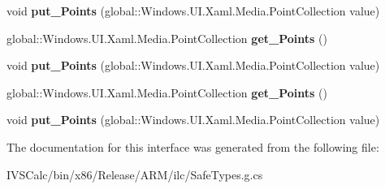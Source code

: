 \begin{DoxyCompactItemize}
\mbox{\label{interface_windows_1_1_u_i_1_1_xaml_1_1_shapes_1_1_i_polygon_aff4656dda579146484457971ae043261}} 
void {\bfseries put\+\_\+\+Points} (global\+::\+Windows.\+U\+I.\+Xaml.\+Media.\+Point\+Collection value)
\item 
\mbox{\label{interface_windows_1_1_u_i_1_1_xaml_1_1_shapes_1_1_i_polygon_a53564a340ab3f6f90c8fa9e62a58c5da}} 
global\+::\+Windows.\+U\+I.\+Xaml.\+Media.\+Point\+Collection {\bfseries get\+\_\+\+Points} ()
\item 
\mbox{\label{interface_windows_1_1_u_i_1_1_xaml_1_1_shapes_1_1_i_polygon_aff4656dda579146484457971ae043261}} 
void {\bfseries put\+\_\+\+Points} (global\+::\+Windows.\+U\+I.\+Xaml.\+Media.\+Point\+Collection value)
\item 
\mbox{\label{interface_windows_1_1_u_i_1_1_xaml_1_1_shapes_1_1_i_polygon_a53564a340ab3f6f90c8fa9e62a58c5da}} 
global\+::\+Windows.\+U\+I.\+Xaml.\+Media.\+Point\+Collection {\bfseries get\+\_\+\+Points} ()
\item 
\mbox{\label{interface_windows_1_1_u_i_1_1_xaml_1_1_shapes_1_1_i_polygon_aff4656dda579146484457971ae043261}} 
void {\bfseries put\+\_\+\+Points} (global\+::\+Windows.\+U\+I.\+Xaml.\+Media.\+Point\+Collection value)
\end{DoxyCompactItemize}


The documentation for this interface was generated from the following file\+:\begin{DoxyCompactItemize}
\item 
I\+V\+S\+Calc/bin/x86/\+Release/\+A\+R\+M/ilc/Safe\+Types.\+g.\+cs\end{DoxyCompactItemize}
